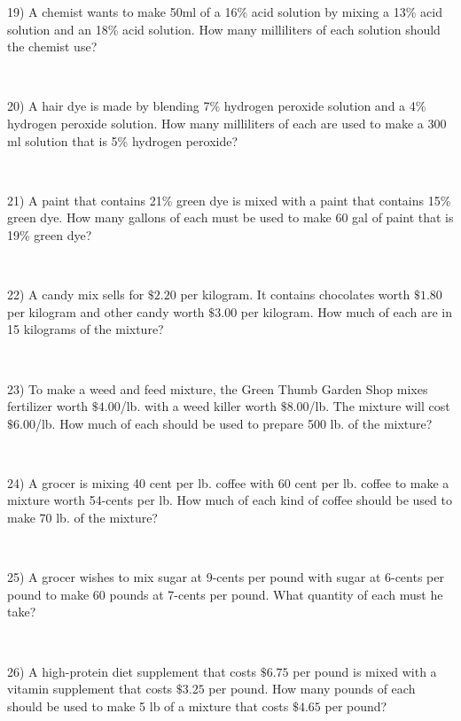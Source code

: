 {19) A chemist wants to make 50ml of a 16\% acid solution by mixing a 13\% acid solution and an 18\% acid solution. How many milliliters of
each solution should the chemist use?\par
~\par

20) A hair dye is made by blending 7\% hydrogen peroxide solution and a 4\% hydrogen peroxide solution. How many milliliters of each
are used to make a 300 ml solution that is 5\% hydrogen
peroxide?\par
~\par

21) A paint that contains 21\% green dye is mixed with a paint that contains
15\%  green dye. How many gallons of each must be used to make 60
gal of paint that is 19\% green dye?\par
~\par

22) A candy mix sells for $\$2.20$ per kilogram. It contains
chocolates worth $\$1.80$  per kilogram and other candy
worth $\$3.00$ per kilogram. How much of each are in
15 kilograms of the mixture?\par
~\par

23) To make a weed and feed mixture, the Green Thumb Garden Shop mixes fertilizer worth $\$4.00$/lb. with a weed killer
worth $\$8.00$/lb. The mixture will cost
$\$6.00$/lb. How much of each should be used to prepare 500 lb. of the mixture?\par
~\par

24) A grocer is mixing 40 cent per lb. coffee with 60 cent per lb. coffee to
make a mixture worth 54-cents per lb. How much of each kind
of coffee should be used to make 70 lb. of the mixture?\par
~\par

25) A grocer wishes to mix sugar at 9-cents per pound with sugar at 6-cents
per pound to make 60 pounds at 7-cents per pound. What quantity
of each must he take?\par
~\par

26) A high-protein diet supplement that costs $\$6.75$ per pound is
mixed with a vitamin supplement that costs $\$3.25$
per pound. How many pounds of each should be used to make 5
lb of a mixture that costs $\$4.65$ per pound?\par
~\par

}
